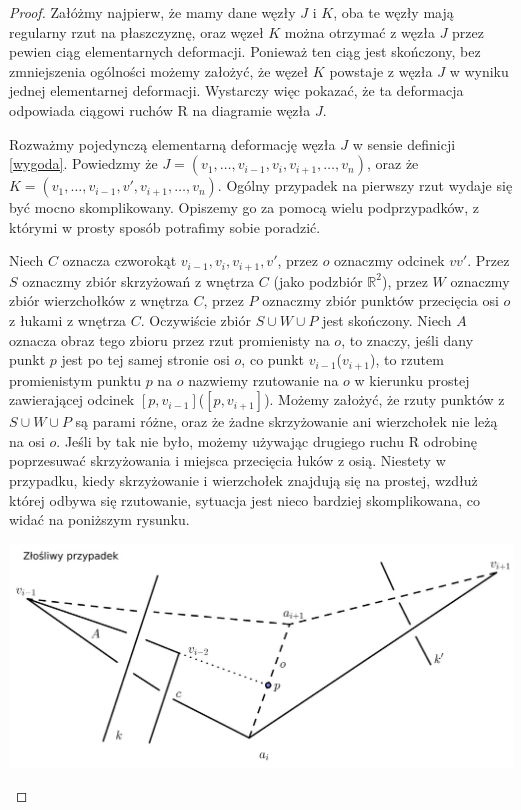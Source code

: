 \begin{proof}

Załóżmy najpierw, że mamy dane węzły $J$ i $K$, oba te węzły mają regularny rzut na płaszczyznę, oraz węzeł $K$ można otrzymać z węzła $J$ przez pewien ciąg elementarnych deformacji.
Ponieważ ten ciąg jest skończony, bez zmniejszenia ogólności możemy założyć, że węzeł $K$ powstaje z węzła $J$ w wyniku jednej elementarnej deformacji. Wystarczy więc pokazać, że 
ta deformacja odpowiada ciągowi ruchów R na diagramie węzła $J$. 

Rozważmy pojedynczą elementarną deformację węzła $J$ w sensie definicji \ref{wygoda}. Powiedzmy że $J = (v_1, \ldots, v_{i-1}, v_i, v_{i+1}, \ldots, v_n)$, oraz że 
$K = (v_1, \ldots, v_{i-1}, v', v_{i+1}, \ldots, v_n)$. Ogólny przypadek na pierwszy rzut wydaje się być mocno skomplikowany. Opiszemy go za pomocą wielu podprzypadków, z którymi
w prosty sposób potrafimy sobie poradzić. 

Niech $C$ oznacza czworokąt $v_{i-1}, v_i, v_{i+1}, v'$, przez $o$ oznaczmy odcinek $vv'$. Przez $S$ oznaczmy zbiór skrzyżowań z wnętrza $C$ (jako podzbiór $\mathbb{R}^2$), 
przez $W$ oznaczmy zbiór wierzchołków z wnętrza $C$, przez $P$ oznaczmy zbiór punktów przecięcia osi $o$ z łukami z wnętrza $C$. 
Oczywiście zbiór $S\cup W\cup P$ jest skończony. Niech $A$ oznacza obraz tego zbioru przez rzut promienisty na $o$, to znaczy, jeśli dany punkt $p$ jest po tej samej stronie osi $o$, 
co punkt $v_{i-1}$($v_{i+1}$), to rzutem promienistym punktu $p$ na $o$ nazwiemy rzutowanie na $o$ w kierunku prostej zawierającej odcinek $[p, v_{i-1}]$($[p, v_{i+1}]$). 
Możemy założyć, że rzuty punktów z $S\cup W\cup P$ są parami różne, oraz że żadne skrzyżowanie ani wierzchołek nie leżą na osi $o$.
Jeśli by tak nie było, możemy używając drugiego ruchu R odrobinę poprzesuwać skrzyżowania i miejsca przecięcia łuków z osią. 
Niestety w przypadku, kiedy skrzyżowanie i wierzchołek znajdują się na prostej, wzdłuż której odbywa się rzutowanie, sytuacja jest nieco bardziej skomplikowana, co widać na poniższym
rysunku.



	\begin{center}

	\includegraphics[scale=0.5]{1/pictures/bad.jpg}
	\end{center}



\end{proof}
